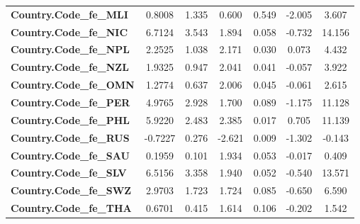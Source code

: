 \begin{center}
\begin{tabular}{lcccccc}
\textbf{Country.Code\_fe\_MLI}                                     &       0.8008  &        1.335     &     0.600  &         0.549        &       -2.005    &        3.607     \\
\textbf{Country.Code\_fe\_NIC}                                     &       6.7124  &        3.543     &     1.894  &         0.058        &       -0.732    &       14.156     \\
\textbf{Country.Code\_fe\_NPL}                                     &       2.2525  &        1.038     &     2.171  &         0.030        &        0.073    &        4.432     \\
\textbf{Country.Code\_fe\_NZL}                                     &       1.9325  &        0.947     &     2.041  &         0.041        &       -0.057    &        3.922     \\
\textbf{Country.Code\_fe\_OMN}                                     &       1.2774  &        0.637     &     2.006  &         0.045        &       -0.061    &        2.615     \\
\textbf{Country.Code\_fe\_PER}                                     &       4.9765  &        2.928     &     1.700  &         0.089        &       -1.175    &       11.128     \\
\textbf{Country.Code\_fe\_PHL}                                     &       5.9220  &        2.483     &     2.385  &         0.017        &        0.705    &       11.139     \\
\textbf{Country.Code\_fe\_RUS}                                     &      -0.7227  &        0.276     &    -2.621  &         0.009        &       -1.302    &       -0.143     \\
\textbf{Country.Code\_fe\_SAU}                                     &       0.1959  &        0.101     &     1.934  &         0.053        &       -0.017    &        0.409     \\
\textbf{Country.Code\_fe\_SLV}                                     &       6.5156  &        3.358     &     1.940  &         0.052        &       -0.540    &       13.571     \\
\textbf{Country.Code\_fe\_SWZ}                                     &       2.9703  &        1.723     &     1.724  &         0.085        &       -0.650    &        6.590     \\
\textbf{Country.Code\_fe\_THA}                                     &       0.6701  &        0.415     &     1.614  &         0.106        &       -0.202    &        1.542     \\
\bottomrule
\end{tabular}
\end{center}